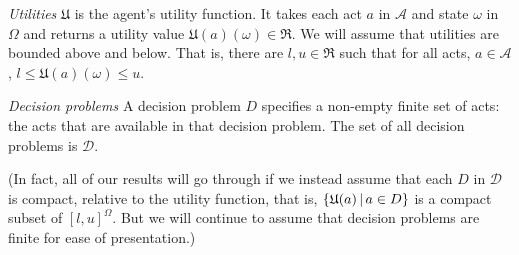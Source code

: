 \documentclass[a4paper]{article}
\newcommand\A{\mathcal{A}}
\newcommand\D{\mathcal{D}}
\renewcommand\S{\mathcal{S}}
\renewcommand\P{\mathbb{P}} %
\renewcommand\c{\mathsf{c}} %
\newcommand\EU{\mathrm{EU}}
\newcommand\REU{\mathrm{REU}}
\newcommand\EAd{\mathrm{EAd}}
\newcommand\U{\mathfrak{U}} %
\newcommand\Maximin{\Gamma}
\newcommand{\IP}{\P}
\newcommand\SetDelimiter[1][]{
	\nonscript\,#1\vert \allowbreak \nonscript\,\mathopen{}}
\providecommand\given{\SetDelimiter}
\renewcommand{\emptyset}{\varnothing}
\renewcommand{\leq}{\leqslant}
\newenvironment{CCM rewritten}
{\begingroup\color{blue}} %
{\endgroup}              %
\begin{document}
 \emph{Utilities } $\U$ is the agent's utility function. It takes each act $a$ in $\A$ and state $\omega$ in $\Omega$ and returns a utility value $\U(a)(\omega)\in\Re$. We will assume that utilities are bounded above and below. That is, there are $l,u\in\Re$ such that for all acts, $a\in\A$, $l\leq \U(a)(\omega)\leq u$. 

\emph{Decision problems } A decision problem $D$ specifies a non-empty finite set of acts: the acts that are available in that decision problem. The set of all decision problems is $\D$. 

(In fact, all of our results will go through if we instead assume that each $D$ in $\D$ is compact, relative to the utility function, that is, $\{\U(a)\given a \in D\}$ is a compact subset of $[l,u]^\Omega$. But we will continue to assume that decision problems are finite for ease of presentation.)


\end{document}
